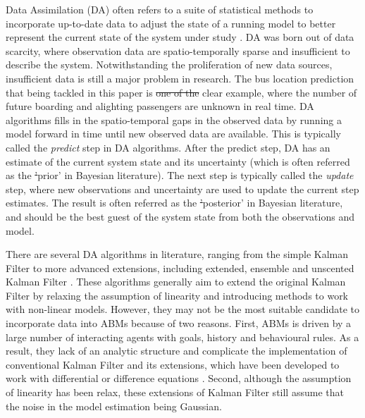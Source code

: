 \documentclass[11pt]{article}
\providecommand{\DIFaddtex}[1]{{\protect\color{blue}\uwave{#1}}} %
\providecommand{\DIFdeltex}[1]{{\protect\color{red}\sout{#1}}}                      %
\providecommand{\DIFaddbegin}{} %
\providecommand{\DIFaddend}{} %
\providecommand{\DIFdelbegin}{} %
\providecommand{\DIFdelend}{} %
\providecommand{\DIFadd}[1]{\texorpdfstring{\DIFaddtex{#1}}{#1}} %
\providecommand{\DIFdel}[1]{\texorpdfstring{\DIFdeltex{#1}}{}} %
\newcommand{\DIFscaledelfig}{0.5}
\newlength{\DIFdelgraphicswidth} %
\newlength{\DIFdelgraphicsheight} %
\newcommand{\DIFaddincludegraphics}[2][]{{\color{blue}\fbox{\DIFOincludegraphics[#1]{#2}}}} %
\newcommand{\DIFdelincludegraphics}[2][]{%
\sbox{\DIFdelgraphicsbox}{\DIFOincludegraphics[#1]{#2}}%
\settoboxwidth{\DIFdelgraphicswidth}{\DIFdelgraphicsbox} %
\settoboxtotalheight{\DIFdelgraphicsheight}{\DIFdelgraphicsbox} %
\scalebox{\DIFscaledelfig}{%
\parbox[b]{\DIFdelgraphicswidth}{\usebox{\DIFdelgraphicsbox}\\[-\baselineskip] \rule{\DIFdelgraphicswidth}{0em}}\llap{\resizebox{\DIFdelgraphicswidth}{\DIFdelgraphicsheight}{%
\setlength{\unitlength}{\DIFdelgraphicswidth}%
\begin{picture}(1,1)%
\thicklines\linethickness{2pt} %
{\color[rgb]{1,0,0}\put(0,0){\framebox(1,1){}}}%
{\color[rgb]{1,0,0}\put(0,0){\line( 1,1){1}}}%
{\color[rgb]{1,0,0}\put(0,1){\line(1,-1){1}}}%
\end{picture}%
}\hspace*{3pt}}} %
} %
\DeclareRobustCommand{\DIFaddbegin}{\DIFOaddbegin \let\includegraphics\DIFaddincludegraphics} %
\DeclareRobustCommand{\DIFaddend}{\DIFOaddend \let\includegraphics\DIFOincludegraphics} %
\DeclareRobustCommand{\DIFdelbegin}{\DIFOdelbegin \let\includegraphics\DIFdelincludegraphics} %
\DeclareRobustCommand{\DIFdelend}{\DIFOaddend \let\includegraphics\DIFOincludegraphics} %
\begin{document}
\DIFaddbegin {}\DIFaddend Data Assimilation (DA) often refers to a suite of statistical methods to incorporate up-to-date data to adjust the state of a running model to better represent the current state of the system under study \citep{ward_dynamic_2016}. DA was born out of data scarcity, where observation data are spatio-temporally sparse and insufficient to describe the system. Notwithstanding the proliferation of new data sources, insufficient data is still a major problem in research. The bus location prediction that being tackled in this paper is \DIFdelbegin \DIFdel{one of the }\DIFdelend \DIFaddbegin \DIFadd{a }\DIFaddend clear example, where the number of future boarding and alighting passengers are unknown in real time. DA algorithms fills in the spatio-temporal gaps in the observed data by running a model forward in time until new observed data are available. This is typically called the \textit{predict} step in DA algorithms. After the predict step, DA has an estimate of the current system state and its uncertainty (which is often referred as the \DIFdelbegin \DIFdel{'}\DIFdelend \DIFaddbegin \DIFadd{`}\DIFaddend prior' in Bayesian literature). The next step is typically called the \textit{update} step, where new observations and uncertainty are used to update the current step estimates. The result is often referred as the \DIFdelbegin \DIFdel{'}\DIFdelend \DIFaddbegin \DIFadd{`}\DIFaddend posterior' in Bayesian literature, and should be the best guest of the system state from both the observations and model\DIFaddbegin {}\DIFaddend .   

There are several DA algorithms in literature, ranging from the simple Kalman Filter \citep{meinhold1983understanding} to more advanced extensions, including extended, ensemble and unscented Kalman Filter \citep{jazwinski_stochastic_1970, evensen_ensemble_2003,wan_unscented_2002}. These algorithms generally aim to extend the original Kalman Filter by relaxing the assumption of linearity and introducing methods to work with non-linear models. However, they may not be the most suitable candidate to incorporate data into ABMs because of two reasons. First, ABMs is driven by a large number of interacting agents with goals, history and behavioural rules. As a result, they lack of an analytic structure and complicate the implementation of conventional Kalman Filter and its extensions, which have been developed to work with differential or difference equations \citep{wang_data_2015}. Second, although the assumption of linearity has been relax, these extensions of Kalman Filter still assume that the noise in the model estimation being Gaussian. 
\end{document}
